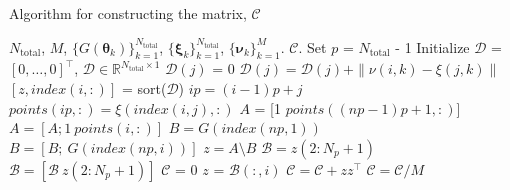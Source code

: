 \bigskip
\begin{breakablealgorithm}
\renewcommand{\algorithmicrequire}{\textbf{Input:}}
\renewcommand{\algorithmicensure}{\textbf{Output:}}
  \caption{Algorithm for constructing the matrix, $\mathcal{C}$}
  \begin{algorithmic}[1]
\Require $N_\text{total}$, $M$, $\{G(\bm\theta_k)\}_{k=1}^{N_\text{total}}$, 
$\{\bm{\xi}_k\}_{k=1}^{N_\text{total}}$,
         $\{\bm{\nu}_k\}_{k=1}^{M}$. 
\Ensure $\mathcal{C}$. 
	\State Set $p$ = $N_\text{total}$ - 1
	\State Initialize $\mathcal{D}$ = $[0,\ldots,0]^\top$, $\mathcal{D}\in
                            \mathbb{R}^{N_\text{total}\times 1}$
	\State $\mathcal{D}(j)$ = 0
	\Statex\hspace{20mm} $\mathcal{D}(j) = \mathcal{D}(j) + \|\nu(i,k) - \xi(j,k)\|$
	\EndFor
	\EndFor
	\State $[z,index(i,:)]$ = sort($\mathcal{D}$)
	\State $ip = (i-1)p + j$
	\State $points(ip,:) = \xi(index(i,j),:)$
	\EndFor
	\EndFor
	\State $A$ = [1 $points((np-1)p+1,:)$]
	\State $A=[A; 1~points(i,:)]$
	\EndFor
	\State $B = G(index(np,1))$
	\State $B = [B;~G(index(np,i))]$
	\EndFor
	\State $z = A\setminus B$
	\State $\mathcal{B} = z(2:N_p+1)$	
	\Else 
	\State $\mathcal{B} = [\mathcal{B}~z(2:N_p+1)]$
	\EndIf
	\EndFor
	\State $\mathcal{C}$ = 0
	\State $z$ = $\mathcal{B}(:,i)$
	\State $\mathcal{C}=\mathcal{C}+zz^\top$
	\EndFor
	\State $\mathcal{C}=\mathcal{C}/M$
    \EndProcedure
  \end{algorithmic}
  \label{alg:C}
\end{breakablealgorithm}
\bigskip
